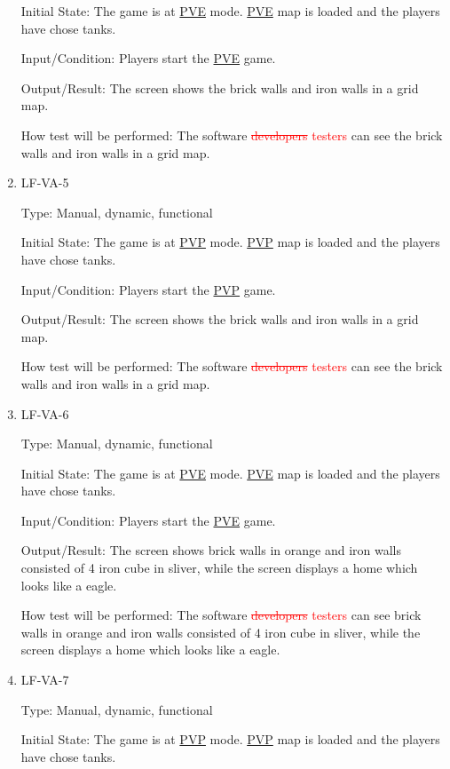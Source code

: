 \documentclass[12pt, titlepage]{article}
\begin{document}
\begin{enumerate}
Initial State: The game is at \underline{PVE} mode. \underline{PVE} map is loaded and the players have chose tanks. 
					
Input/Condition: Players start the \underline{PVE} game. 
					
Output/Result: The screen shows the brick walls and iron walls in a grid map.
					
How test will be performed: The software \textcolor{red}{\sout{developers} testers} can see the brick walls and iron walls in a grid map.

\item{LF-VA-5\\}

Type: Manual, dynamic, functional
					
Initial State: The game is at \underline{PVP} mode. \underline{PVP} map is loaded and the players have chose tanks. 
					
Input/Condition: Players start the \underline{PVP} game. 
					
Output/Result: The screen shows the brick walls and iron walls in a grid map.
					
How test will be performed: The software \textcolor{red}{\sout{developers} testers} can see the brick walls and iron walls in a grid map.

\item{LF-VA-6\\}

Type: Manual, dynamic, functional
					
Initial State: The game is at \underline{PVE} mode. \underline{PVE} map is loaded and the players have chose tanks. 
					
Input/Condition: Players start the \underline{PVE} game. 
					
Output/Result: The screen shows brick walls in orange and iron walls consisted of 4 iron cube in sliver, while the screen displays a home which looks like a eagle.
					
How test will be performed: The software \textcolor{red}{\sout{developers} testers} can see brick walls in orange and iron walls consisted of 4 iron cube in sliver, while the screen displays a home which looks like a eagle.

\item{LF-VA-7\\}

Type: Manual, dynamic, functional
					
Initial State: The game is at \underline{PVP} mode. \underline{PVP} map is loaded and the players have chose tanks. 
					

\end{enumerate}
\end{document}
